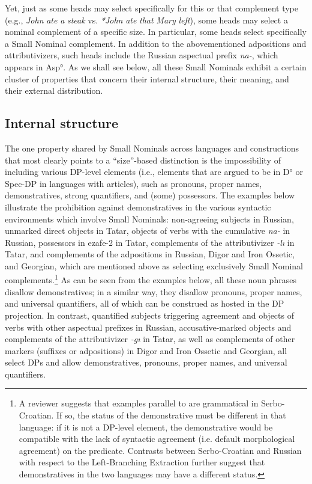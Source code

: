 \documentclass[output=paper]{langsci/langscibook}
\begin{document}
Yet, just as some heads may select specifically for this or that complement type (e.g., \textit{John} \textit{ate} \textit{a} \textit{steak} vs. \textit{*John} \textit{ate} \textit{that} \textit{Mary} \textit{left}), some heads may select a nominal complement of a specific size. In particular, some heads select specifically a Small Nominal complement. In addition to the abovementioned adpositions and attributivizers, such heads include the Russian aspectual prefix \textit{na-}, which appears in Asp°. As we shall see below, all these Small Nominals exhibit a certain cluster of properties that concern their internal structure, their meaning, and their external distribution.

\subsection{Internal structure}  %

The one property shared by Small Nominals across languages and constructions that most clearly points to a “size”-based distinction is the impossibility of including various DP-level elements (i.e., elements that are argued to be in D° or Spec-DP in languages with articles), such as pronouns, proper names, demonstratives, strong quantifiers, and (some) possessors. The examples below illustrate the prohibition against demonstratives in the various syntactic environments which involve Small Nominals: non-agreeing subjects in Russian, unmarked direct objects in Tatar, objects of verbs with the cumulative \textit{na-} in Russian, possessors in ezafe-2 in Tatar, complements of the attributivizer \textit{{}-lı} in Tatar, and complements of the adpositions in Russian, Digor and Iron Ossetic, and Georgian, which are mentioned above as selecting exclusively Small Nominal complements.\footnote{A reviewer suggests that examples parallel to  are grammatical in Serbo-Croatian. If so, the status of the demonstrative must be different in that language: if it is not a DP-level element, the demonstrative would be compatible with the lack of syntactic agreement (i.e. default morphological agreement) on the predicate. Contrasts between Serbo-Croatian and Russian with respect to the Left-Branching Extraction further suggest that demonstratives in the two languages may have a different status.} As can be seen from the examples below, all these noun phrases disallow demonstratives; in a similar way, they disallow pronouns, proper names, and universal quantifiers, all of which can be construed as hosted in the DP projection. In contrast, quantified subjects triggering agreement and objects of verbs with other aspectual prefixes in Russian, accusative-marked objects and complements of the attributivizer \textit{{}-gı} in Tatar, as well as complements of other markers (suffixes or adpositions) in Digor and Iron Ossetic and Georgian, all select DPs and allow demonstratives, pronouns, proper names, and universal quantifiers.
\end{document}
